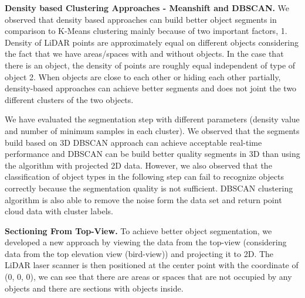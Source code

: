 \textbf{Density based Clustering Approaches - Meanshift and DBSCAN.} We observed that density based approaches can build better object segments in comparison to K-Means clustering mainly because of two important factors, 1. Density of LiDAR points are approximately equal on different objects considering the fact that we have areas/spaces with and without objects. In the case that there is an object, the density of points are roughly equal independent of type of object 2. When objects are close to each other or hiding each other partially, density-based approaches can achieve better segments and does not joint the two different clusters of the two objects.  

We have evaluated the segmentation step with different parameters (density value and number of minimum samples in each cluster). We observed that the segments build based on 3D DBSCAN approach can achieve acceptable real-time performance and  DBSCAN can be build better quality segments in 3D than using the algorithm with projected 2D data. However, we also observed that the classification of object types in the following step can fail to recognize objects correctly because the segmentation quality is not sufficient. DBSCAN clustering algorithm is also able to remove the noise form the data set and return point cloud data with cluster labels. 


\textbf{Sectioning From Top-View.}
To achieve better object segmentation, we developed a new approach by viewing the data from the top-view (considering data from the top elevation view (bird-view)) and projecting it to 2D. The LiDAR laser scanner is then positioned at the center point with the coordinate of (0, 0, 0), we can see that there are areas or spaces that are not occupied by any objects and there are sections with objects inside.     

 




